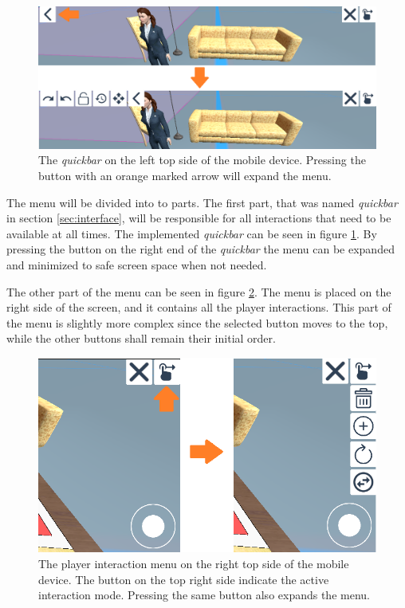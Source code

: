 \begin{figure}[htb]
    \centering
    \includegraphics[width=1\textwidth]{Implementation/img/quickmenu.png}
    \caption{The \textit{quickbar} on the left top side of the mobile device. Pressing the button with an orange marked arrow will expand the menu.}\label{fig:quickmenu}
\end{figure}

The menu will be divided into to parts.
The first part, that was named \textit{quickbar} in section \ref{sec:interface}, will be responsible for all interactions that need to be available at all times.
The implemented \textit{quickbar} can be seen in figure \ref{fig:quickmenu}.
By pressing the button on the right end of the \textit{quickbar} the menu can be expanded and minimized to safe screen space when not needed.

The other part of the menu can be seen in figure \ref{fig:interaction_menu}.
The menu is placed on the right side of the screen, and it contains all the player interactions.
This part of the menu is slightly more complex since the selected button moves to the top, while the other buttons shall remain their initial order.

\begin{figure}[htb]
    \centering
    \includegraphics[width=1\textwidth]{Implementation/img/menu.png}
    \caption{The player interaction menu on the right top side of the mobile device. The button on the top right side indicate the active interaction mode. Pressing the same button also expands the menu.}\label{fig:interaction_menu}
\end{figure}

